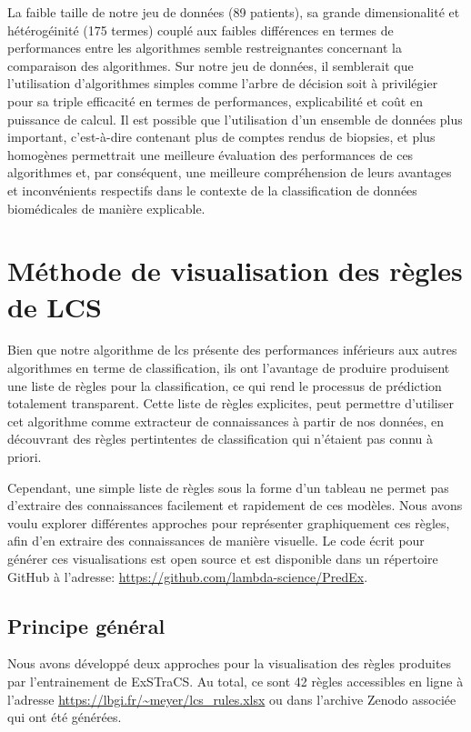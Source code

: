 La faible taille de notre jeu de données (89 patients), sa grande dimensionalité et hétérogéinité (175 termes) couplé aux faibles différences en termes de performances entre les algorithmes semble restreignantes concernant la comparaison des algorithmes. Sur notre jeu de données, il semblerait que l'utilisation d'algorithmes simples comme l'arbre de décision soit à privilégier pour sa triple efficacité en termes de performances, explicabilité et coût en puissance de calcul.  Il est possible que l'utilisation d'un ensemble de données plus important, c’est-à-dire contenant plus de comptes rendus de biopsies, et plus homogènes permettrait une meilleure évaluation des performances de ces algorithmes et, par conséquent, une meilleure compréhension de leurs avantages et inconvénients respectifs dans le contexte de la classification de données biomédicales de manière explicable.

\section{Méthode de visualisation des règles de LCS}
Bien que notre algorithme de \gls{lcs} présente des performances inférieurs aux autres algorithmes en terme de classification, ils ont l'avantage de produire produisent une liste de règles pour la classification, ce qui rend le processus de prédiction totalement transparent. Cette liste de règles explicites, peut permettre d'utiliser cet algorithme comme extracteur de connaissances à partir de nos données, en découvrant des règles pertintentes de classification qui n'étaient pas connu à priori.

Cependant, une simple liste de règles sous la forme d'un tableau ne permet pas d'extraire des connaissances facilement et rapidement de ces modèles. Nous avons voulu explorer différentes approches pour représenter graphiquement ces règles, afin d'en extraire des connaissances de manière visuelle. Le code écrit pour générer ces visualisations est open source et est disponible dans un répertoire GitHub à l'adresse: \url{https://github.com/lambda-science/PredEx}.

\subsection{Principe général}
Nous avons développé deux approches pour la visualisation des règles produites par l'entrainement de  ExSTraCS. Au total, ce sont 42 règles accessibles en ligne à l'adresse \url{https://lbgi.fr/~meyer/lcs_rules.xlsx} ou dans l'archive Zenodo associée qui ont été générées.

